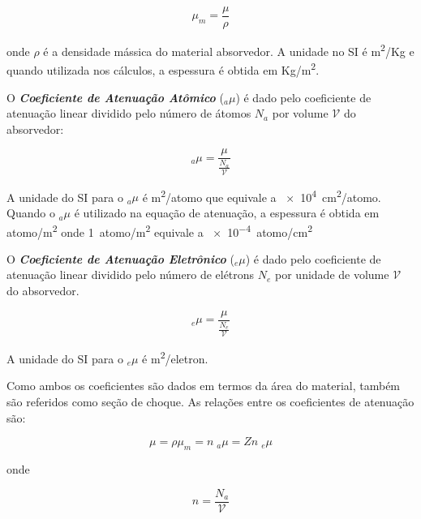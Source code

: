 \documentclass[11pt,a4paper]{article}
\begin{document}
                \begin{equation}
                    \mu_m = \frac{\mu}{\rho}
                \end{equation}

            \noindent onde $\rho$ é a densidade mássica do material absorvedor. A unidade no SI é \unit{m^2/Kg} e quando utilizada nos cálculos, a espessura é obtida em \unit{Kg/m^2}.

            O \textbf{\textit{\textcolor{CarnationPink}{Coeficiente de Atenuação Atômico}}} (${}_a\mu$) é dado pelo coeficiente de atenuação linear dividido pelo número de átomos $N_a$ por volume $\mathcal{V}$ do absorvedor:

                \begin{equation}
                    {}_a\mu = \frac{\mu}{\frac{N_a}{\mathcal{V}}}
                \end{equation}

            \noindent A unidade do SI para o ${}_a\mu$ é \unit{m^2/atomo} que equivale a \qty{e4}{cm^2/atomo}. Quando o ${}_a\mu$ é utilizado na equação de atenuação, a espessura é obtida em \unit{atomo/m^2} onde \qty{1}{atomo/m^2} equivale a \qty{e-4}{atomo/cm^2}


            O \textbf{\textit{\textcolor{CarnationPink}{Coeficiente de Atenuação Eletrônico}}} (${}_e\mu$) é dado pelo coeficiente de atenuação linear dividido pelo número de elétrons $N_e$ por unidade de volume $\mathcal{V}$ do absorvedor.

            \begin{equation}
                {}_e\mu = \frac{\mu}{\frac{N_e}{\mathcal{V}}}
            \end{equation}

            \noindent A unidade do SI para o ${}_e\mu$ é \unit{m^2/eletron}.

            Como ambos os coeficientes são dados em termos da área do material, também são referidos como seção de choque. As relações entre os coeficientes de atenuação são:

            \begin{equation}
                \mu = \rho \mu_m = n\;{}_a\mu = Zn\;{}_e\mu
            \end{equation}

            \noindent onde 

                \begin{equation}
                    n = \frac{N_a}{\mathcal{V}}
                \end{equation}
\end{document}
